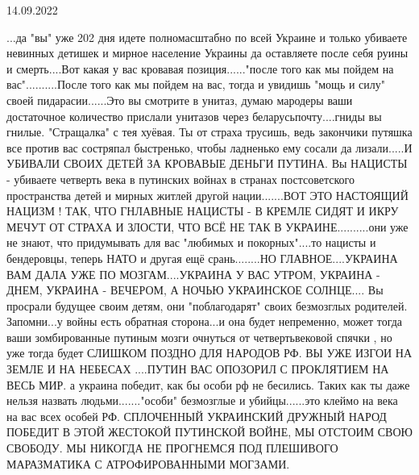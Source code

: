 14.09.2022

...да "вы" уже 202 дня идете полномасштабно по всей Украине и только убиваете
невинных детишек и мирное население Украины да оставляете после себя руины и
смерть....Вот какая у вас кровавая позиция......"после того как мы пойдем на
вас"..........После того как мы пойдем на вас, тогда и увидишь "мощь и силу"
своей пидарасии......Это вы смотрите в унитаз, думаю мародеры ваши достаточное
количество прислали унитазов через беларусьпочту....гниды вы гнилые.
"Стращалка" с тея хуёвая. Ты от страха трусишь, ведь закончики путяшка все
против вас состряпал быстренько, чтобы ладненько ему сосали да лизали.....И
УБИВАЛИ СВОИХ ДЕТЕЙ ЗА КРОВАВЫЕ ДЕНЬГИ ПУТИНА. Вы НАЦИСТЫ - убиваете четверть
века в путинских войнах в странах постсоветского пространства детей и мирных
житлей другой нации.......ВОТ ЭТО НАСТОЯЩИЙ НАЦИЗМ ! ТАК, ЧТО ГНЛАВНЫЕ НАЦИСТЫ
- В КРЕМЛЕ СИДЯТ И ИКРУ МЕЧУТ ОТ СТРАХА И ЗЛОСТИ, ЧТО ВСЁ НЕ ТАК В
УКРАИНЕ..........они уже не знают, что придумывать для вас "любимых и
покорных"....то нацисты и бендеровцы, теперь НАТО и другая ещё срань........НО
ГЛАВНОЕ....УКРАИНА ВАМ ДАЛА УЖЕ ПО МОЗГАМ....УКРАИНА У ВАС УТРОМ, УКРАИНА -
ДНЕМ, УКРАИНА - ВЕЧЕРОМ, А НОЧЬЮ УКРАИНСКОЕ СОЛНЦЕ.... Вы просрали будущее
своим детям, они "поблагодарят" своих безмозглых родителей. Запомни...у войны
есть обратная сторона...и она будет непременно, может тогда ваши зомбированные
путиным мозги очнуться от четвертьвековой спячки , но уже тогда будет СЛИШКОМ
ПОЗДНО ДЛЯ НАРОДОВ РФ. ВЫ УЖЕ ИЗГОИ НА ЗЕМЛЕ И НА НЕБЕСАХ ....ПУТИН ВАС
ОПОЗОРИЛ С ПРОКЛЯТИЕМ НА ВЕСЬ МИР. а украина победит, как бы особи рф не
бесились. Таких как ты даже нельзя назвать людьми......."особи" безмозглые и
убийцы......это клеймо на века на вас всех особей РФ. СПЛОЧЕННЫЙ УКРАИНСКИЙ
ДРУЖНЫЙ НАРОД ПОБЕДИТ В ЭТОЙ ЖЕСТОКОЙ ПУТИНСКОЙ ВОЙНЕ, МЫ ОТСТОИМ СВОЮ СВОБОДУ.
МЫ НИКОГДА НЕ ПРОГНЕМСЯ ПОД ПЛЕШИВОГО МАРАЗМАТИКА С АТРОФИРОВАННЫМИ МОГЗАМИ.
